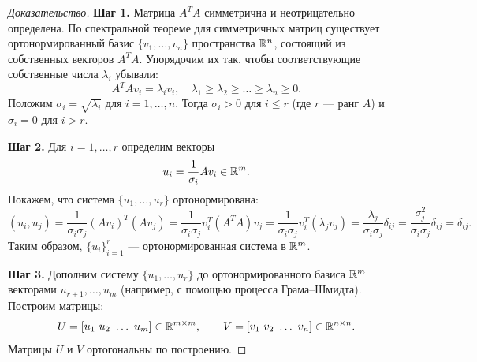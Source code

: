 \documentclass[10pt]{article}
\begin{document}
\begin{proof}[Доказательство]
    \textbf{Шаг 1.} Матрица $A^T A$ симметрична и неотрицательно определена. По спектральной теореме для симметричных матриц существует ортонормированный базис $\{v_1,\dots,v_n\}$ пространства $\mathbb{R}^n$, состоящий из собственных векторов $A^TA$. Упорядочим их так, чтобы соответствующие собственные числа $\lambda_i$ убывали:
    \[
    A^TA v_i = \lambda_i v_i, \quad \lambda_1 \ge \lambda_2 \ge \dots \ge \lambda_n \ge 0.
    \]
    Положим $\sigma_i = \sqrt{\lambda_i}$ для $i=1,\dots,n$. Тогда $\sigma_i>0$ для $i\le r$ (где $r$ — ранг $A$) и $\sigma_i=0$ для $i>r$.

    \textbf{Шаг 2.} Для $i=1,\dots,r$ определим векторы
    \[
    u_i = \frac{1}{\sigma_i} A v_i \in \mathbb{R}^m.
    \]
    Покажем, что система $\{u_1,\dots,u_r\}$ ортонормирована:
    \[
    (u_i, u_j) = \frac{1}{\sigma_i\sigma_j} (A v_i)^T (A v_j) = \frac{1}{\sigma_i\sigma_j} v_i^T (A^T A) v_j = \frac{1}{\sigma_i\sigma_j} v_i^T (\lambda_j v_j) = \frac{\lambda_j}{\sigma_i\sigma_j} \delta_{ij} = \frac{\sigma_j^2}{\sigma_i\sigma_j}\delta_{ij} = \delta_{ij}.
    \]
    Таким образом, $\{u_i\}_{i=1}^r$ — ортонормированная система в $\mathbb{R}^m$.

    \textbf{Шаг 3.} Дополним систему $\{u_1,\dots,u_r\}$ до ортонормированного базиса $\mathbb{R}^m$ векторами $u_{r+1},\dots,u_m$ (например, с помощью процесса Грама–Шмидта). Построим матрицы:
    \[
    U = [u_1\ u_2\ \dots\ u_m] \in \mathbb{R}^{m\times m},\qquad V = [v_1\ v_2\ \dots\ v_n] \in \mathbb{R}^{n\times n}.
    \]
    Матрицы $U$ и $V$ ортогональны по построению.


\end{proof}
\end{document}
